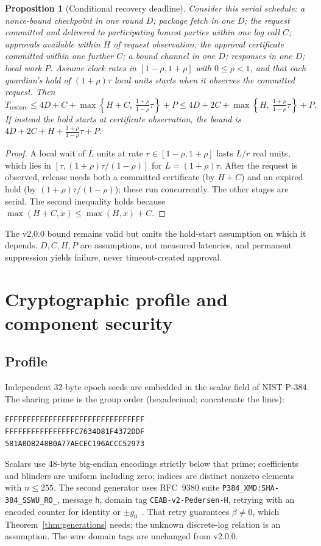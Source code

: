 \documentclass[pdflatex,sn-mathphys-num]{sn-jnl}
\theoremstyle{plain}
\newtheorem{proposition}[theorem]{Proposition}
\theoremstyle{definition}
\newcommand{\code}[1]{\texttt{#1}}
\begin{document}
\begin{proposition}[Conditional recovery deadline]\label{prop:deadline}
Consider this serial schedule: a nonce-bound checkpoint in one round $D$; package fetch in one $D$; the request committed and delivered to participating honest parties within one log call $C$; approvals available within $H$ of request observation; the approval certificate committed within one further $C$; a bound channel in one $D$; responses in one $D$; local work $P$. Assume clock rates in $[1-\rho,1+\rho]$ with $0\le\rho<1$, and that each guardian's hold of $(1+\rho)\tau$ local units starts when it observes the committed request. Then
\begin{equation}\label{eq:deadline}
 T_{\mathrm{restore}}\le4D+C+\max\!\left\{H+C,\ \tfrac{1+\rho}{1-\rho}\tau\right\}+P
 \le4D+2C+\max\!\left\{H,\ \tfrac{1+\rho}{1-\rho}\tau\right\}+P.
\end{equation}
If instead the hold starts at certificate observation, the bound is $4D+2C+H+\frac{1+\rho}{1-\rho}\tau+P$.
\end{proposition}
\begin{proof}
A local wait of $L$ units at rate $r\in[1-\rho,1+\rho]$ lasts $L/r$ real units, which lies in $[\tau,(1+\rho)\tau/(1-\rho)]$ for $L=(1+\rho)\tau$. After the request is observed, release needs both a committed certificate (by $H+C$) and an expired hold (by $(1+\rho)\tau/(1-\rho)$); these run concurrently. The other stages are serial. The second inequality holds because $\max(H+C,x)\le\max(H,x)+C$.
\end{proof}

The v2.0.0 bound remains valid but omits the hold-start assumption on which it depends. $D,C,H,P$ are assumptions, not measured latencies, and permanent suppression yields failure, never timeout-created approval.


\section{Cryptographic profile and component security}\label{sec:crypto}

\subsection{Profile}\label{sec:profile}
Independent 32-byte epoch seeds are embedded in the scalar field of NIST P-384. The sharing prime is the group order (hexadecimal; concatenate the lines):
\begin{Verbatim}[fontsize=\small]
FFFFFFFFFFFFFFFFFFFFFFFFFFFFFFFF
FFFFFFFFFFFFFFFFC7634D81F4372DDF
581A0DB248B0A77AECEC196ACCC52973
\end{Verbatim}
Scalars use 48-byte big-endian encodings strictly below that prime; coefficients and blinders are uniform including zero; indices are distinct nonzero elements with $n\le255$. The second generator uses RFC~9380 suite \code{P384\_XMD:SHA-384\_SSWU\_RO\_}, message \code{h}, domain tag \code{CEAB-v2-Pedersen-H}, retrying with an encoded counter for identity or $\pm g_0$~\cite{rfc9380,sec2}. That retry guarantees $\beta\ne0$, which Theorem~\ref{thm:generations} needs; the unknown discrete-log relation is an assumption. The wire domain tags are unchanged from v2.0.0.
\end{document}
